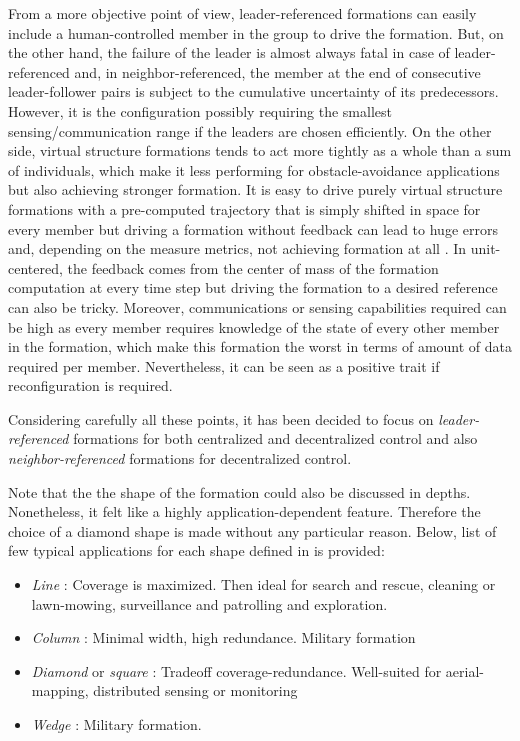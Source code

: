 \documentclass[a4paper, 12pt]{report}
\begin{document}
From a more objective point of view, leader-referenced formations can easily include a human-controlled member in the group to drive the formation. But, on the other hand, the failure of the leader is  almost always fatal in case of leader-referenced and, in neighbor-referenced, the member at the end of consecutive leader-follower pairs is subject to the cumulative uncertainty of its predecessors. However, it is the configuration possibly requiring the smallest sensing/communication range if the leaders are chosen efficiently.
On the other side, virtual structure formations tends to act more tightly as a whole than a sum of individuals, which make it less performing for obstacle-avoidance applications but also achieving stronger formation. It is easy to drive purely virtual structure formations with a pre-computed trajectory that is simply shifted in space for every member but driving a formation without feedback can lead to huge errors and, depending on the measure metrics, not achieving formation at all \cite{Pugh2009}. In unit-centered, the feedback comes from the center of mass of the formation computation at every time step but driving the formation to a desired reference can also be tricky. Moreover, communications or sensing capabilities required can be high as every member requires knowledge of the state of every other member in the formation, which make this formation the worst in terms of amount of data required per member. Nevertheless, it can be seen as a positive trait if reconfiguration is required.

Considering carefully all these points, it has been decided to focus on \emph{leader-referenced} formations for both centralized and decentralized control and also \emph{neighbor-referenced} formations for decentralized control.

Note that the the shape of the formation could also be discussed in depths. Nonetheless, it felt like a highly application-dependent feature. Therefore the choice of a diamond shape is made without any particular reason. Below, list of few typical applications for each shape defined in \cite{Arkin1999} is provided:
\begin{itemize}
\item \emph{Line} : Coverage is maximized. Then ideal for search and rescue, cleaning or lawn-mowing, surveillance and patrolling and exploration.
\item \emph{Column} : Minimal width, high redundance. Military formation
\item \emph{Diamond} or \emph{square} : Tradeoff coverage-redundance. Well-suited for aerial-mapping, distributed sensing or monitoring
\item \emph{Wedge} : Military formation.
\end{itemize}
\end{document}
